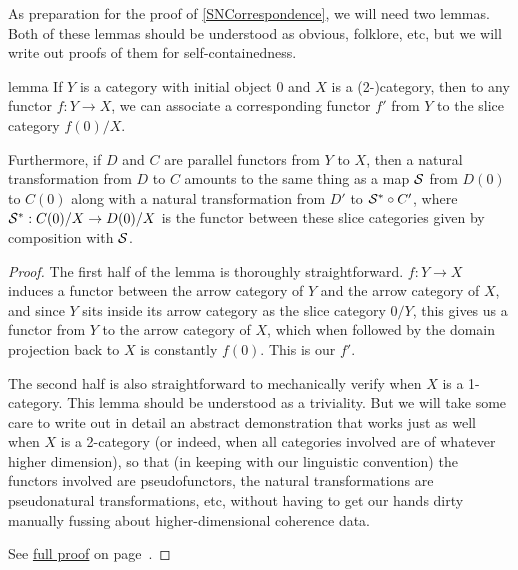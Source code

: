 As preparation for the proof of \cref{SNCorrespondence}, we will need two lemmas. Both of these lemmas should be understood as obvious, folklore, etc, but we will write out proofs of them for self-containedness.

\begin{theoremEnd}[category=IntrospLemmas]{lemma}\label{Lemma1}
If $Y$ is a category with initial object $0$ and $X$ is a (2-)category, then to any functor $f : Y \to X$, we can associate a corresponding functor $f'$ from $Y$ to the slice category $f(0)/X$.

Furthermore, if $D$ and $C$ are parallel functors from $Y$ to $X$, then a natural transformation from $D$ to $C$ amounts to the same thing as a map $\mathcal{S}$ from $D(0)$ to $C(0)$ along with a natural transformation from $D'$ to $\mathcal{S}^{*} \circ C'$, where $\mathcal{S}^{*} : C(0)/X \to D(0)/X$ is the functor between these slice categories given by composition with $\mathcal{S}$.
\end{theoremEnd}
\begin{proof}
The first half of the lemma is thoroughly straightforward. $f : Y \to X$ induces a functor between the arrow category of $Y$ and the arrow category of $X$, and since $Y$ sits inside its arrow category as the slice category $0/Y$, this gives us a functor from $Y$ to the arrow category of $X$, which when followed by the domain projection back to $X$ is constantly $f(0)$. This is our $f'$.

The second half is also straightforward to mechanically verify when $X$ is a 1-category. This lemma should be understood as a triviality. But we will take some care to write out in detail an abstract demonstration that works just as well when $X$ is a 2-category (or indeed, when all categories involved are of whatever higher dimension), so that (in keeping with our linguistic convention) the functors involved are pseudofunctors, the natural transformations are pseudonatural transformations, etc, without having to get our hands dirty manually fussing about higher-dimensional coherence data.

See \hyperref[proof:prAtEnd\pratendcountercurrent]{full proof} on page~\pageref{proof:prAtEnd\pratendcountercurrent}.
\end{proof}
